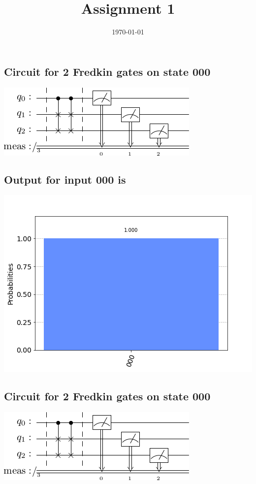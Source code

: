 \documentclass[a4paper]{article}
\date{\today}
\title{Assignment 1}
\begin{document}
    \header{}

    \begin{answer}[Question 1 a]
        \subsection*{Circuit for 2 Fredkin gates on state 000}
        \includegraphics[scale = 0.5]{1a000.png}
        \subsection*{Output for input 000 is}
        \includegraphics[scale = 0.5]{1a000-out.png}
        \subsection*{Circuit for 2 Fredkin gates on state 000}
        \includegraphics[scale = 0.5]{1a000.png}

\end{answer}
\end{document}
